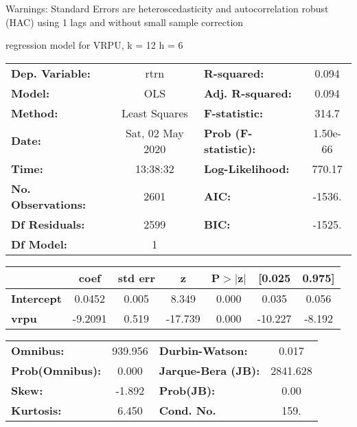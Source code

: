 Warnings: \newline
 [1] Standard Errors are heteroscedasticity and autocorrelation robust (HAC) using 1 lags and without small sample correction\ 

regression model for VRPU, k = 12 h = 6\begin{center}
\begin{tabular}{lclc}
\toprule
\textbf{Dep. Variable:}    &       rtrn       & \textbf{  R-squared:         } &     0.094   \\
\textbf{Model:}            &       OLS        & \textbf{  Adj. R-squared:    } &     0.094   \\
\textbf{Method:}           &  Least Squares   & \textbf{  F-statistic:       } &     314.7   \\
\textbf{Date:}             & Sat, 02 May 2020 & \textbf{  Prob (F-statistic):} &  1.50e-66   \\
\textbf{Time:}             &     13:38:32     & \textbf{  Log-Likelihood:    } &    770.17   \\
\textbf{No. Observations:} &        2601      & \textbf{  AIC:               } &    -1536.   \\
\textbf{Df Residuals:}     &        2599      & \textbf{  BIC:               } &    -1525.   \\
\textbf{Df Model:}         &           1      & \textbf{                     } &             \\
\bottomrule
\end{tabular}
\begin{tabular}{lcccccc}
                   & \textbf{coef} & \textbf{std err} & \textbf{z} & \textbf{P$> |$z$|$} & \textbf{[0.025} & \textbf{0.975]}  \\
\midrule
\textbf{Intercept} &       0.0452  &        0.005     &     8.349  &         0.000        &        0.035    &        0.056     \\
\textbf{vrpu}      &      -9.2091  &        0.519     &   -17.739  &         0.000        &      -10.227    &       -8.192     \\
\bottomrule
\end{tabular}
\begin{tabular}{lclc}
\textbf{Omnibus:}       & 939.956 & \textbf{  Durbin-Watson:     } &    0.017  \\
\textbf{Prob(Omnibus):} &   0.000 & \textbf{  Jarque-Bera (JB):  } & 2841.628  \\
\textbf{Skew:}          &  -1.892 & \textbf{  Prob(JB):          } &     0.00  \\
\textbf{Kurtosis:}      &   6.450 & \textbf{  Cond. No.          } &     159.  \\
\bottomrule
\end{tabular}
\end{center}

